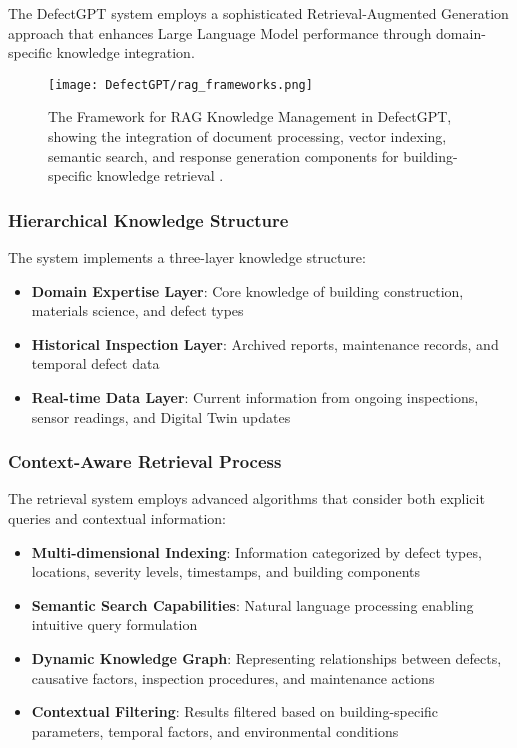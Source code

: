 The DefectGPT system employs a sophisticated Retrieval-Augmented Generation approach that enhances Large Language Model performance through domain-specific knowledge integration.

\begin{figure}[htbp]
    \centering
    \texttt{[image: DefectGPT/rag\_frameworks.png]}
    \caption{The Framework for RAG Knowledge Management in DefectGPT, showing the integration of document processing, vector indexing, semantic search, and response generation components for building-specific knowledge retrieval \cite{zhang2024automated}.}
    \label{fig:rag-framework}
\end{figure}

\subsubsection{Hierarchical Knowledge Structure}

The system implements a three-layer knowledge structure:

\begin{itemize}
    \item \textbf{Domain Expertise Layer}: Core knowledge of building construction, materials science, and defect types
    \item \textbf{Historical Inspection Layer}: Archived reports, maintenance records, and temporal defect data
    \item \textbf{Real-time Data Layer}: Current information from ongoing inspections, sensor readings, and Digital Twin updates
\end{itemize}

\subsubsection{Context-Aware Retrieval Process}

The retrieval system employs advanced algorithms that consider both explicit queries and contextual information:

\begin{itemize}
    \item \textbf{Multi-dimensional Indexing}: Information categorized by defect types, locations, severity levels, timestamps, and building components
    \item \textbf{Semantic Search Capabilities}: Natural language processing enabling intuitive query formulation
    \item \textbf{Dynamic Knowledge Graph}: Representing relationships between defects, causative factors, inspection procedures, and maintenance actions
    \item \textbf{Contextual Filtering}: Results filtered based on building-specific parameters, temporal factors, and environmental conditions
\end{itemize}

